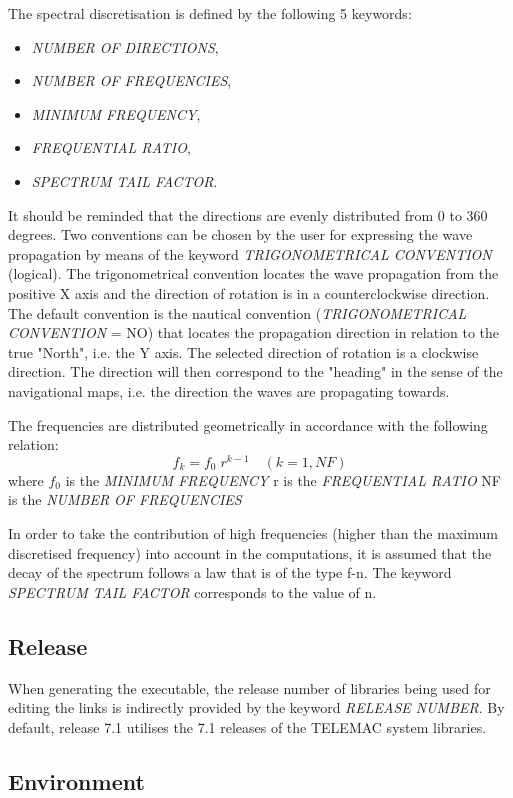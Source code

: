  The spectral discretisation is defined by the following 5 keywords:  
\begin{itemize} 
\item  \textit{NUMBER OF DIRECTIONS}, \item     \textit{NUMBER OF FREQUENCIES}, \item    \textit{MINIMUM FREQUENCY}, \item    \textit{FREQUENTIAL RATIO}, \item    \textit{SPECTRUM TAIL FACTOR}.
\end{itemize}
 It should be reminded that the directions are evenly distributed from 0 to 360 degrees. Two conventions can be chosen by the user for expressing the wave propagation by means of the keyword \textit{TRIGONOMETRICAL CONVENTION }(logical). The trigonometrical convention locates the wave propagation from the positive X axis and the direction of rotation is in a counterclockwise direction. The default convention is the nautical convention (\textit{TRIGONOMETRICAL CONVENTION} = NO) that locates the propagation direction in relation to the true "North", i.e. the Y axis. The selected direction of rotation is a clockwise direction. The direction will then correspond to the "heading" in the sense of the navigational maps, i.e. the direction the waves are propagating towards.

 The frequencies are distributed geometrically in accordance with the following relation:
\[f_{k} =f_{0} \; r^{k-1} \quad (k=1,NF)\]
where $f_{0} $ is the \textit{MINIMUM FREQUENCY }  r is the \textit{FREQUENTIAL RATIO}   NF is the \textit{NUMBER OF FREQUENCIES}

 In order to take the contribution of high frequencies (higher than the maximum discretised frequency) into account in the computations, it is assumed that the decay of the spectrum follows a law that is of the type f-n. The keyword \textit{SPECTRUM TAIL FACTOR }corresponds to the value of n.


\subsection{ Release}

 When generating the executable, the release number of libraries being used for editing the links is indirectly provided by the keyword \textit{\tomawac RELEASE NUMBER}. By default, \tomawac release 7.1 utilises the 7.1 releases of the TELEMAC system libraries.


\subsection{ Environment}


